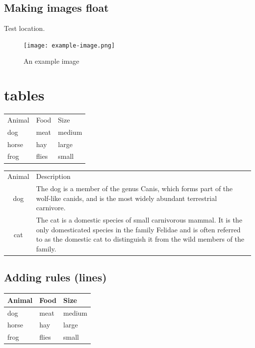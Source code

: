 \documentclass{article}
\begin{document}
\subsection{Making images float}
\lipsum[1-5] %

Test location.
\begin{figure}[ht]
  \centering
  \texttt{[image: example-image.png]}
  \caption{An example image}
\end{figure}

\lipsum[6-7] %

\section{tables}

\begin{tabular}{*{3}{l}}
  Animal & Food  & Size   \\
  dog    & meat  & medium \\
  horse  & hay   & large  \\
  frog   & flies & small  \\
\end{tabular}

\begin{tabular}{cp{9cm}}
  Animal & Description \\
  dog    & The dog is a member of the genus Canis, which forms part of the
           wolf-like canids, and is the most widely abundant terrestrial
           carnivore. \\
  cat    & The cat is a domestic species of small carnivorous mammal. It is the
           only domesticated species in the family Felidae and is often referred
           to as the domestic cat to distinguish it from the wild members of the
           family. \\
\end{tabular}

\subsection{Adding rules (lines)}

\begin{tabular}{lll}
  \toprule
  Animal & Food  & Size   \\
  \midrule
  dog    & meat  & medium \\
  horse  & hay   & large  \\
  frog   & flies & small  \\
  \bottomrule
\end{tabular}
\end{document}
